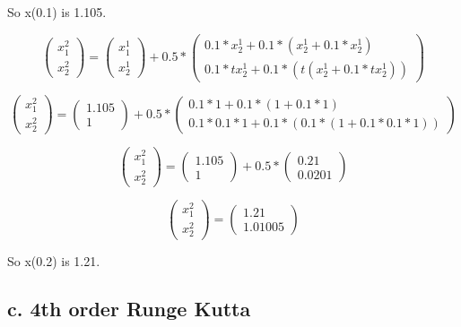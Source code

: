 \documentclass[]{article}
\begin{document}
So x(0.1) is 1.105.

\[
\left(\begin{array}{c} 
x_1^2\\
x_2^2
\end{array}\right)=
\left(\begin{array}{c} 
x_1^1 \\
x_2^1 
\end{array}\right) + 0.5 *
\left(\begin{array}{c}
0.1 * x_2^1 + 0.1 * (x_2^1 + 0.1 * x_2^1) \\
0.1 * tx_2^1 + 0.1 * (t(x_2^1 + 0.1 * tx_2^1)) 
\end{array}\right)
\]

\[
\left(\begin{array}{c} 
x_1^2\\
x_2^2
\end{array}\right)=
\left(\begin{array}{c} 
1.105 \\
1 
\end{array}\right) + 0.5 *
\left(\begin{array}{c}
0.1 * 1 + 0.1 * (1 + 0.1 * 1) \\
0.1 * 0.1 * 1 + 0.1 * (0.1 * (1 + 0.1 * 0.1 * 1)) 
\end{array}\right)
\]

\[
\left(\begin{array}{c} 
x_1^2\\
x_2^2
\end{array}\right)=
\left(\begin{array}{c} 
1.105 \\
1 
\end{array}\right) + 0.5 *
\left(\begin{array}{c}
0.21\\
0.0201 
\end{array}\right)
\]

\[
\left(\begin{array}{c} 
x_1^2\\
x_2^2
\end{array}\right)=
\left(\begin{array}{c} 
1.21 \\
1.01005
\end{array}\right)
\]

So x(0.2) is 1.21.

\subsection{c. 4th order Runge Kutta}\label{c.-4th-order-runge-kutta}
\end{document}

